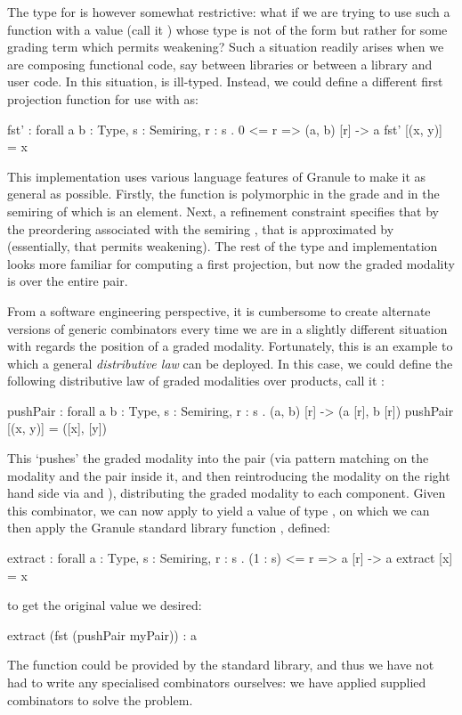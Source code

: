 The type for  is however somewhat restrictive: what if
we are trying to use such a function with a value (call it
) whose type is not
of the form  but rather  for
some grading term  which permits weakening? Such a situation
readily arises when we are composing functional code, say between
libraries or between a library and user code. In this situation,
 is ill-typed. Instead, we could define a
different first projection function for use with  as:
%
\begin{granule}
fst' : forall {a b : Type, s : Semiring, r : s} . {0 <= r} => (a, b) [r] -> a
fst' [(x, y)] = x
\end{granule}
%
This implementation uses various language features of Granule to make
it as general as possible. Firstly, the function is polymorphic
in the grade  and in the semiring  of which 
is an element. Next, a refinement constraint  specifies
that by the preordering \granin{<=} associated with the semiring
, that  is approximated by 
(essentially, that  permits weakening). The rest
of the type and implementation looks more familiar for computing
a first projection, but now the graded
modality is over the entire pair.

From a software engineering perspective, it is cumbersome to
create alternate versions of generic combinators every time we are
in a slightly different situation with regards the position of a
graded modality.  Fortunately, this is an example to which a
general \emph{distributive law} can be deployed. In this case,
we could define the following distributive law of graded modalities over
products, call it :
%
\begin{granule}
pushPair : forall {a b : Type, s : Semiring, r : s} . (a, b) [r] -> (a [r], b [r])
pushPair [(x, y)] = ([x], [y])
\end{granule}
%
This `pushes' the graded modality  into
the pair (via pattern matching on the modality and the pair inside it, and then
reintroducing the modality on the right hand side via \granin{[x]} and
\granin{[y]}), distributing the graded modality to each component.
Given this combinator, we can now apply  to yield a value of
type , on which we can then apply the Granule standard library
function , defined:
\begin{granule}
  extract : forall {a : Type, s : Semiring, r : s} . {(1 : s) <= r} => a [r] -> a
  extract [x] = x
\end{granule}
 to get the original  value we desired:
%
\begin{granule}
extract (fst (pushPair myPair)) : a
\end{granule}
%
The  function could be provided by the standard
library, and thus we have not had to write any specialised combinators
ourselves: we have applied supplied combinators to solve the problem.

